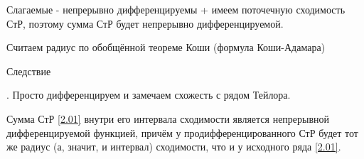 \begin{col-answer-preambule}
\end{col-answer-preambule}

\begin{plan}
\item Слагаемые - непрерывно дифференцируемы + имеем поточечную сходимость СтР, поэтому сумма СтР будет непрерывно дифференцируемой.
\item Считаем радиус по обобщённой теореме Коши (формула Коши-Адамара)
\end{plan}
Следствие

\begin{plan}
\item. Просто дифференцируем и замечаем схожесть с рядом Тейлора.
\end{plan}
\begin{theorem}
	Сумма СтР \eqref{2.01} внутри его интервала сходимости является непрерывной дифференцируемой функцией, причём у продифференцированного СтР
	будет тот же радиус (а, значит, и интервал) сходимости, что и у исходного ряда \eqref{2.01}.
\end{theorem}
